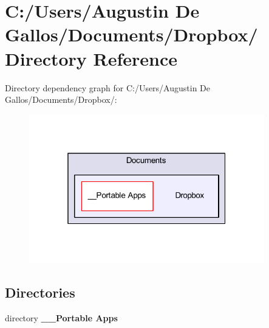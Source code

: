 \section{C\-:/\-Users/\-Augustin De Gallos/\-Documents/\-Dropbox/ Directory Reference}
\label{dir_e61be3634b4aa7dedf812eb06823a663}
Directory dependency graph for C\-:/\-Users/\-Augustin De Gallos/\-Documents/\-Dropbox/\-:\nopagebreak
\begin{figure}[H]
\begin{center}
\leavevmode
\includegraphics[width=290pt]{dir_e61be3634b4aa7dedf812eb06823a663_dep}
\end{center}
\end{figure}
\subsection*{Directories}
\begin{DoxyCompactItemize}
\item 
directory {\bf \-\_\-\-\_\-\-Portable Apps}
\end{DoxyCompactItemize}
